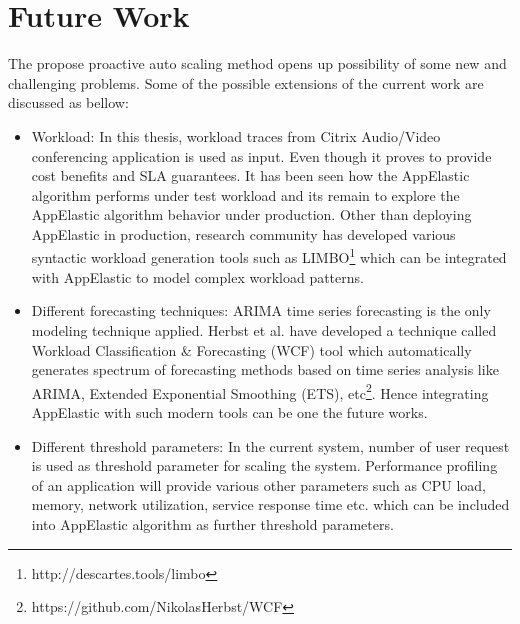 \section{Future Work}
\label{sec:Future Work}
The propose proactive auto scaling method opens up possibility of some new and challenging problems. Some of the possible extensions of the current work are discussed as bellow:
\begin{itemize}
  \item Workload: In this thesis, workload traces from Citrix Audio/Video conferencing application is used as input. Even though it proves to provide cost benefits and SLA guarantees. It has been seen how the AppElastic algorithm performs under test workload and its remain to explore the AppElastic algorithm behavior under production. Other than deploying AppElastic in production, research community has developed various syntactic workload generation tools such as LIMBO\cite{von2014limbo}\footnote{http://descartes.tools/limbo} which can be integrated with AppElastic to model complex workload patterns.
  \item Different forecasting techniques: ARIMA time series forecasting is the only modeling technique applied. Herbst et al.\cite{herbst2012workload} have developed a technique called Workload Classification \& Forecasting (WCF) tool which automatically generates spectrum of forecasting methods based on time series analysis like ARIMA, Extended Exponential Smoothing (ETS), etc\cite{herbst2012workload}\footnote{https://github.com/NikolasHerbst/WCF}. Hence integrating AppElastic with such modern tools can be one the future works.
  \item Different threshold parameters: In the current system, number of user request is used as threshold parameter for scaling the system. Performance profiling of an application will provide various other parameters such as CPU load, memory, network utilization, service response time etc. which can be included into AppElastic algorithm as further threshold parameters.
\end{itemize}
